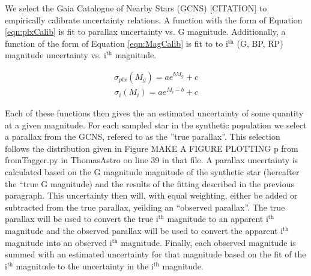 We select the Gaia Catalogue of Nearby Stars (GCNS) {\color{red}[CITATION]} to
empirically calibrate uncertainty relations. A function with the form of
Equation \ref{eqn:plxCalib} is fit to parallax uncertainty vs. G magnitude.
Additionally, a function of the form of Equation \ref{eqn:MagCalib} is fit to
to i$^{\text{th}}$ (G, BP, RP) magnitude uncertainty vs. i$^{\text{th}}$
magnitude.

\begin{align}\label{eqn:plxCalib}
	\sigma_{plx}(M_{g}) = ae^{bM_{g}}+c
\end{align}
\begin{align}\label{eqn:MagCalib}
	\sigma_{i}(M_{i}) = ae^{M_{i}-b}+c
\end{align}

Each of these functions then gives the an estimated uncertainty of some
quantity at a given magnitude. For each sampled star in the synthetic
population we select a parallax from the GCNS, refered to as the ''true
parallax''. This selection follows the distribution given in Figure
{\color{red} MAKE A FIGURE PLOTTING p from fromTagger.py in ThomasAstro on line
39 in that file}. A parallax uncertainty is calculated based on the G magnitude
magnitude of the synthetic star (hereafter the ``true G magnitude) and the
results of the fitting described in the previous paragraph. This uncertainty
then will, with equal weighting, either be added or subtracted from the true
parallax, yeilding an ``observed parallax''. The true parallax will be used to
convert the true i$^{\text{th}}$ magnitude to an apparent i$^{\text{th}}$
magnitude and the observed parallax will be used to convert the apparent
i$^{\text{th}}$ magnitude into an observed i$^{\text{th}}$ magnitude. Finally,
each observed magnitude is summed with an estimated uncertainty for that
magnitude based on the fit of the i$^{\text{th}}$ magnitude to the uncertainty
in the i$^{\text{th}}$ magnitude.

